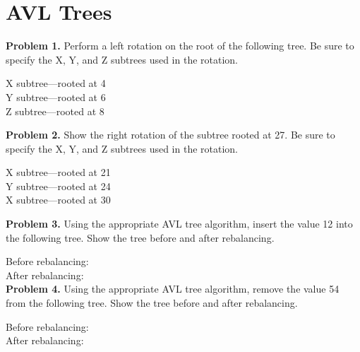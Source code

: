 \documentclass{article}
\begin{document}
\section{AVL Trees}

\noindent \textbf{Problem 1.} Perform a left rotation on the root of the following tree.  Be sure to specify the X, Y, and Z subtrees used in the rotation.

\vspace{1em}

\noindent X subtree---rooted at 4\\
Y subtree---rooted at 6\\
Z subtree---rooted at 8


\noindent \textbf{Problem 2.} Show the right rotation of the subtree rooted at 27.  Be sure to specify the X, Y, and Z subtrees used in the rotation.

\vspace{1em}

\noindent X subtree---rooted at 21\\
Y subtree---rooted at 24\\
X subtree---rooted at 30



\noindent \textbf{Problem 3.} Using the appropriate AVL tree algorithm, insert the value 12 into the following tree.  Show the tree before and after rebalancing.

\vspace{1em}

Before rebalancing:\\


After rebalancing:\\


\noindent \textbf{Problem 4.} Using the appropriate AVL tree algorithm, remove the value 54 from the following tree.  Show the tree before and after rebalancing.
\vspace{1em}



Before rebalancing:\\


After rebalancing:\\

\end{document}
